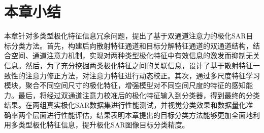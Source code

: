 \section{本章小结}
本章针对多类型极化特征信息冗余问题，提出了基于双通道注意力的极化SAR目标分类方法。首先，构建后向散射特征通道和目标分解特征通道的双通道结构，结合空间、通道注意力机制，实现对两种类型极化特征中有效信息的激发而抑制无关信息。然后，为了充分挖掘两类极化特征之间的关联信息，设计了基于散射特征一致性的注意力修正方法，对注意力特征进行动态校正。其次，通过多尺度特征学习模块，聚合不同空间尺寸的极化特征，增强模型对不同空间尺度的特征的感知能力。最后，将经过双通道注意力校准后的极化特征输入到分类器，得到最终的分类结果。在两组真实极化SAR数据集进行性能测试，并视觉分类效果和数据量化准确率两个层面进行性能评估，结果表明本章提出的目标分类方法能够更加全面地利用多类型极化特征信息，提升极化SAR图像目标分类精度。